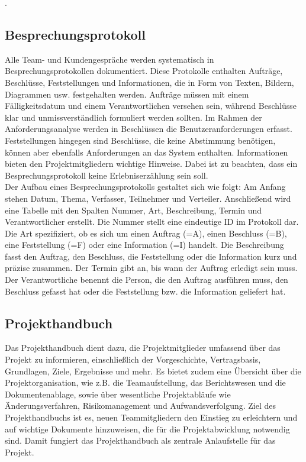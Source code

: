 \cite{Sommerville10}.

\subsection{Besprechungsprotokoll}  \label{Besprechungsprotokoll}

Alle Team- und Kundengespräche werden systematisch in Besprechungsprotokollen dokumentiert. Diese Protokolle enthalten 
Aufträge, Beschlüsse, Feststellungen und Informationen, die in Form von Texten, Bildern, Diagrammen usw. festgehalten 
werden. Aufträge müssen mit einem Fälligkeitsdatum und einem Verantwortlichen versehen sein, während Beschlüsse klar 
und unmissverständlich formuliert werden sollten. Im Rahmen der Anforderungsanalyse werden in Beschlüssen die 
Benutzeranforderungen erfasst. Feststellungen hingegen sind Beschlüsse, die keine Abstimmung benötigen, können 
aber ebenfalls Anforderungen an das System enthalten. Informationen bieten den Projektmitgliedern wichtige Hinweise. 
Dabei ist zu beachten, dass ein Besprechungsprotokoll keine Erlebniserzählung sein soll.\\

Der Aufbau eines Besprechungsprotokolls gestaltet sich wie folgt: Am Anfang stehen Datum, Thema, Verfasser, 
Teilnehmer und Verteiler. Anschließend wird eine Tabelle mit den Spalten Nummer, Art, Beschreibung, Termin und 
Verantwortlicher erstellt. Die Nummer stellt eine eindeutige ID im Protokoll dar. Die Art spezifiziert, ob es sich 
um einen Auftrag (=A), einen Beschluss (=B), eine Feststellung (=F) oder eine Information (=I) handelt. Die 
Beschreibung fasst den Auftrag, den Beschluss, die Feststellung oder die Information kurz und präzise zusammen. Der 
Termin gibt an, bis wann der Auftrag erledigt sein muss. Der Verantwortliche benennt die Person, die den Auftrag 
ausführen muss, den Beschluss gefasst hat oder die Feststellung bzw. die Information geliefert hat.

\subsection{Projekthandbuch}  \label{Projekthandbuch}

Das Projekthandbuch dient dazu, die Projektmitglieder umfassend über das Projekt zu informieren, einschließlich der 
Vorgeschichte, Vertragsbasis, Grundlagen, Ziele, Ergebnisse und mehr. Es bietet zudem eine Übersicht über die 
Projektorganisation, wie z.B. die Teamaufstellung, das Berichtswesen und die Dokumentenablage, sowie über wesentliche 
Projektabläufe wie Änderungsverfahren, Risikomanagement und Aufwandsverfolgung. Ziel des Projekthandbuchs ist es, neuen 
Teammitgliedern den Einstieg zu erleichtern und auf wichtige Dokumente hinzuweisen, die für die Projektabwicklung 
notwendig sind. Damit fungiert das Projekthandbuch als zentrale Anlaufstelle für das Projekt.\\

